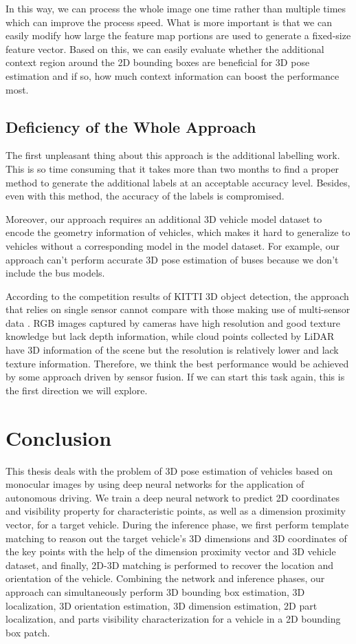 \documentclass[a4paper,12pt]{article}
\begin{document}
In this way, we can process the whole image one time rather than multiple times which can improve the process speed. What is more important is that we can easily modify how large the feature map portions are used to generate a fixed-size feature vector. Based on this, we can easily evaluate whether the additional context region around the 2D bounding boxes are beneficial for 3D pose estimation and if so, how much context information can boost the performance most.  


\subsection{Deficiency of the Whole Approach}
The first unpleasant thing about this approach is the additional labelling work. This is so time consuming that it takes more than two months to find a proper method to generate the additional labels at an acceptable accuracy level. Besides, even with this method, the accuracy of the labels is compromised.

Moreover, our approach requires an additional 3D vehicle model dataset to encode the geometry information of vehicles, which makes it hard to generalize to vehicles without a corresponding model in the model dataset. For example, our approach can't perform accurate 3D pose estimation of buses because we don't include the bus models.

According to the competition results of KITTI 3D object detection, the approach that relies on single sensor cannot compare with those making use of multi-sensor data \cite{3dobject}. RGB images captured by cameras have high resolution and good texture knowledge but lack depth information, while cloud points collected by LiDAR have 3D information of the scene but the resolution is relatively lower and lack texture information. Therefore, we think the best performance would be achieved by some approach driven by sensor fusion. If we can start this task again, this is the first direction we will explore.


\clearpage

\section{Conclusion}
 This thesis deals with the problem of 3D pose estimation of vehicles based on monocular images by using deep neural networks for the application of autonomous driving. We train a deep neural network to predict 2D coordinates and visibility property for characteristic points, as well as a dimension proximity vector, for a target vehicle. During the inference phase, we first perform template matching to reason out the target vehicle's 3D dimensions and 3D coordinates of the key points with the help of the dimension proximity vector and 3D vehicle dataset, and finally, 2D-3D matching is performed to recover the location and orientation of the vehicle. Combining the network and inference phases, our approach can simultaneously perform 3D bounding box estimation, 3D localization, 3D orientation estimation, 3D dimension estimation, 2D part localization, and parts visibility characterization for a vehicle in a 2D bounding box patch. 
 
\end{document}
